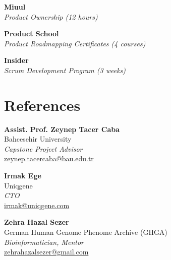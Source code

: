 \documentclass[a4paper,10pt]{article}
\newcommand{\sepspace}{\noindent\makebox[\linewidth]{\rule{\textwidth}{0.4pt}}}
\begin{document}
\vspace{0.1cm}
      

\noindent\textbf{Miuul} \\
\textit{Product Ownership (12 hours)}

\vspace{0.1cm}


\noindent\textbf{Product School} \\
\textit{Product Roadmapping Certificates (4 courses)}

\vspace{0.1cm}

\noindent\textbf{Insider} \\
\textit{Scrum Development Program (3 weeks)}

\sepspace

\section*{References}
\vspace{0.1cm}

\noindent\textbf{Assist. Prof. Zeynep Tacer Caba} \\
Bahcesehir University \\
\textit{Capstone Project Advisor} \\
\href{mailto:zeynep.tacercaba@bau.edu.tr}{zeynep.tacercaba@bau.edu.tr}

\vspace{0.2cm}

\noindent\textbf{Irmak Ege} \\
Uniqgene \\
\textit{CTO} \\
\href{mailto:irmak@uniqgene.com}{irmak@uniqgene.com}

\vspace{0.2cm}

\noindent\textbf{Zehra Hazal Sezer} \\
German Human Genome Phenome Archive (GHGA) \\
\textit{Bioinformatician, Mentor} \\
\href{mailto:zehrahazalsezer@gmail.com}{zehrahazalsezer@gmail.com}
\end{document}
